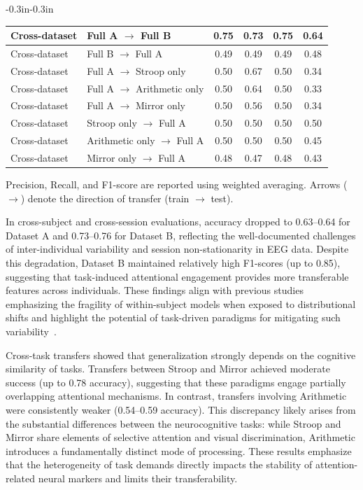 \documentclass[10pt,letterpaper]{article}
\begin{document}
\begin{table}[!ht]
\begin{adjustwidth}{-0.3in}{-0.3in}
\begin{tabular}{|l|l|c|c|c|c|}
Cross-dataset & Full A $\rightarrow$ Full B                & 0.75 & 0.73 & 0.75 & 0.64 \\ \hline
Cross-dataset & Full B $\rightarrow$ Full A                & 0.49 & 0.49 & 0.49 & 0.48 \\ \hline
Cross-dataset & Full A $\rightarrow$ Stroop only           & 0.50 & 0.67 & 0.50 & 0.34 \\ \hline
Cross-dataset & Full A $\rightarrow$ Arithmetic only       & 0.50 & 0.64 & 0.50 & 0.33 \\ \hline
Cross-dataset & Full A $\rightarrow$ Mirror only           & 0.50 & 0.56 & 0.50 & 0.34 \\ \hline
Cross-dataset & Stroop only $\rightarrow$ Full A           & 0.50 & 0.50 & 0.50 & 0.50 \\ \hline
Cross-dataset & Arithmetic only $\rightarrow$ Full A       & 0.50 & 0.50 & 0.50 & 0.45 \\ \hline
Cross-dataset & Mirror only $\rightarrow$ Full A           & 0.48 & 0.47 & 0.48 & 0.43 \\ \hline
\end{tabular}
\begin{flushleft} Precision, Recall, and F1-score are reported using weighted averaging. Arrows ($\rightarrow$) denote the direction of transfer (train $\rightarrow$ test).
\end{flushleft}
\end{adjustwidth}
\end{table}

In cross-subject and cross-session evaluations, accuracy dropped to 0.63--0.64 for Dataset A and 0.73--0.76 for Dataset B, reflecting the well-documented challenges of inter-individual variability and session non-stationarity in EEG data. Despite this degradation, Dataset B maintained relatively high F1-scores (up to 0.85), suggesting that task-induced attentional engagement provides more transferable features across individuals. These findings align with previous studies emphasizing the fragility of within-subject models when exposed to distributional shifts and highlight the potential of task-driven paradigms for mitigating such variability~\cite{chen2025hybrid,abdulridha2023attention}.

Cross-task transfers showed that generalization strongly depends on the cognitive similarity of tasks. Transfers between Stroop and Mirror achieved moderate success (up to 0.78 accuracy), suggesting that these paradigms engage partially overlapping attentional mechanisms. In contrast, transfers involving Arithmetic were consistently weaker (0.54--0.59 accuracy). This discrepancy likely arises from the substantial differences between the neurocognitive tasks: while Stroop and Mirror share elements of selective attention and visual discrimination, Arithmetic introduces a fundamentally distinct mode of processing. These results emphasize that the heterogeneity of task demands directly impacts the stability of attention-related neural markers and limits their transferability.
\end{document}

